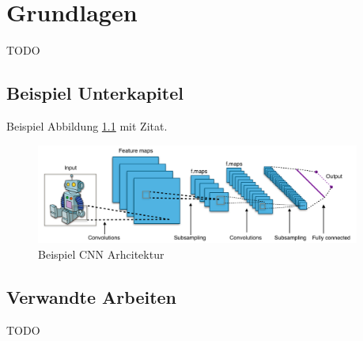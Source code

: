 
\chapter{Grundlagen}
TODO

\section{Beispiel Unterkapitel} 
Beispiel Abbildung \ref{img:cnn_example_network} mit Zitat.
\begin{figure}[H]
	\centering
	\includegraphics[width=0.95\textwidth]{resources/cnn/typical_cnn}
	\caption{Beispiel CNN Arhcitektur \cite{typical_cnn_img}}
	\label{img:cnn_example_network}
\end{figure}

\section{Verwandte Arbeiten}
TODO
